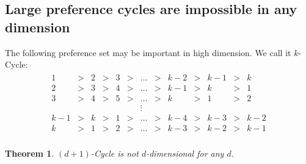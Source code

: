 \documentclass[12pt]{article}
\newtheorem{theorem}{Theorem}
\newcommand{\1}[1]{\mathds{1}[{#1}]}
\begin{document}
  \subsection{Large preference cycles are impossible in any dimension}
    The following preference set may be important in high dimension.
    We call it $k$-{\sc Cycle}:
    \begin{align*}
      \begin{array}{ccccccccccccccccccccccccccccccccccccccccc}
      1 &>& 2 &>& 3 &>&\ldots &>& k-2 &>& k-1 &>& k \\
      2 &>& 3 &>& 4 &>& \ldots &>& k-1 &>& k &>& 1 \\
      3 &>& 4 &>& 5 &>& \ldots &>& k &>& 1 &>& 2 \\
        &&    &&    &&   \vdots \\
      k-1&>&k&>& 1 &>&\ldots &>& k-4 &>& k-3 &>& k-2\\
      k &>& 1 &>& 2 &>& \ldots &>& k-3 &>& k-2 &>& k-1 \\
      \end{array}
    \end{align*}
    \begin{theorem}\label{thrm:noBigCycles}
      $(d+1)$-{\sc Cycle} is not $d$-dimensional for any $d$.
    \end{theorem}
\end{document}
